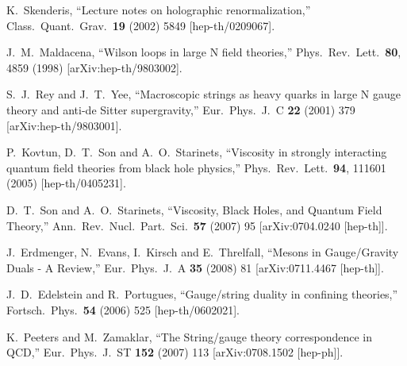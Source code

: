 \documentclass[12pt,notitlepage]{article}
\begin{document}
\begin{thebibliography}{99.}
  
  
  K.~Skenderis,
  ``Lecture notes on holographic renormalization,''
  Class.\ Quant.\ Grav.\  {\bf 19} (2002) 5849
  [hep-th/0209067].

  J.~M.~Maldacena,
  ``Wilson loops in large N field theories,''
  Phys.\ Rev.\ Lett.\  {\bf 80}, 4859 (1998)
  [arXiv:hep-th/9803002].


  S.~J.~Rey and J.~T.~Yee,
  ``Macroscopic strings as heavy quarks in large N gauge theory and  anti-de
  Sitter supergravity,''
  Eur.\ Phys.\ J.\  C {\bf 22} (2001) 379
  [arXiv:hep-th/9803001].


 
  P.~Kovtun, D.~T.~Son and A.~O.~Starinets,
  ``Viscosity in strongly interacting quantum field theories from black hole physics,''
  Phys.\ Rev.\ Lett.\  {\bf 94}, 111601 (2005)
  [hep-th/0405231].
 
 
 
 
 
 
  D.~T.~Son and A.~O.~Starinets,
  ``Viscosity, Black Holes, and Quantum Field Theory,''
  Ann.\ Rev.\ Nucl.\ Part.\ Sci.\  {\bf 57} (2007) 95
  [arXiv:0704.0240 [hep-th]].
 
 
 
 
  J.~Erdmenger, N.~Evans, I.~Kirsch and E.~Threlfall,
  ``Mesons in Gauge/Gravity Duals - A Review,''
  Eur.\ Phys.\ J.\ A {\bf 35} (2008) 81
  [arXiv:0711.4467 [hep-th]].

 
 
  J.~D.~Edelstein and R.~Portugues,
  ``Gauge/string duality in confining theories,''
  Fortsch.\ Phys.\  {\bf 54} (2006) 525
  [hep-th/0602021].
 
 
 
 
  K.~Peeters and M.~Zamaklar,
  ``The String/gauge theory correspondence in QCD,''
  Eur.\ Phys.\ J.\ ST {\bf 152} (2007) 113
  [arXiv:0708.1502 [hep-ph]].
 




\end{thebibliography}
\end{document}
